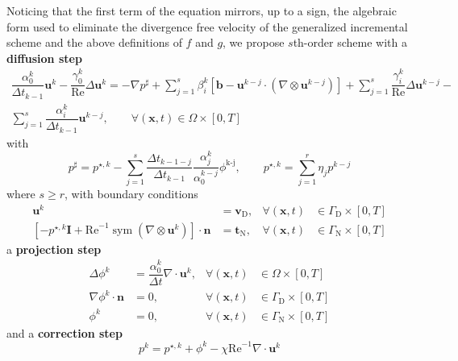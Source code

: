 \documentclass[]{scrartcl}
\newcommand{\bs}[1]{\boldsymbol{#1}}
\DeclareMathOperator{\Sym}{sym}
\begin{document}
Noticing that the first term of the equation mirrors, up to a sign, the algebraic form used to eliminate the divergence free velocity of the generalized incremental scheme and the above definitions of $f$ and $g$, we propose $s$th-order scheme with a \textbf{diffusion step}
\begin{equation*}
\begin{split}
	\dfrac{\alpha_0^k}{\Delta t_{k-1}} \bs{u}^{k} -\dfrac{\gamma_0^k}{\textrm{Re}} \Delta \bs{u}^{k} = -\nabla p^{\sharp} + \sum_{j=1}^{s} \beta_i^k \left[ \bs{b} - \bs{u}^{k-j} \cdot (\nabla \otimes \bs{u}^{k-j})\right] +
	\sum_{j=1}^{s} \dfrac{\gamma_i^k}{\textrm{Re}} \Delta \bs{u}^{k-j} -  \\ \sum_{j=1}^{s} \dfrac{\alpha_i^k}{\Delta t_{k-1}}\bs{u}^{k-j}, \qquad \forall(\bs{x},t)\in \Omega \times [0, T]
\end{split}
\end{equation*}
with
\begin{equation*}
	 p^\sharp = p^{\star, k} - \sum_{j=1}^{s} \frac{\Delta t_{k-1-j}}{\Delta t_{k-1}}          \frac{\alpha_j^k}{\alpha_0^{k-j}}\phi^\textrm{k-j} ,
	 \qquad
	 p^{\star, k} = \sum_{j=1}^{r} \eta_j p^{k-j}
\end{equation*}
where $s\ge r$, with boundary conditions
\begin{equation*}
	\begin{aligned}
		\bs{u}^{k} &= \bs{v}_\textrm{D}, &\forall(\bs{x}, t) &\in \Gamma_\textrm{D} \times [0, T] \\
		[- p^{\star, k} \bs{I} + \textrm{Re}^{-1} \Sym (\nabla \otimes \bs{u}^{k})] \cdot \bs{n} &= \bs{t}_\textrm{N},  &\forall(\bs{x}, t) &\in \Gamma_\textrm{N} \times [0, T]
	\end{aligned}
\end{equation*}
a \textbf{projection step}
\begin{equation*}
\begin{aligned}
\Delta \phi^{k} &= \dfrac{\alpha_0^k}{\Delta t} \nabla \cdot \bs{u}^{k},  &\forall (\bs{x}, t) &\in \Omega \times \left[0, T \right] \\
\nabla \phi^{k} \cdot \bs{n} &= 0, &\forall (\bs{x}, t) &\in \Gamma_\textrm{D} \times \left[0, T \right] \\
\phi^{k} &= 0, &\forall\left(\bs{x}, t\right) &\in \Gamma_\textrm{N} \times \left[0, T \right]
\end{aligned}
\end{equation*}
and a \textbf{correction step}
\begin{equation*}
	p^{k} = p^{\star, k} + \phi^{k} - \chi\textrm{Re}^{-1} \nabla \cdot \bs{u}^{k}
\end{equation*}
\end{document}
